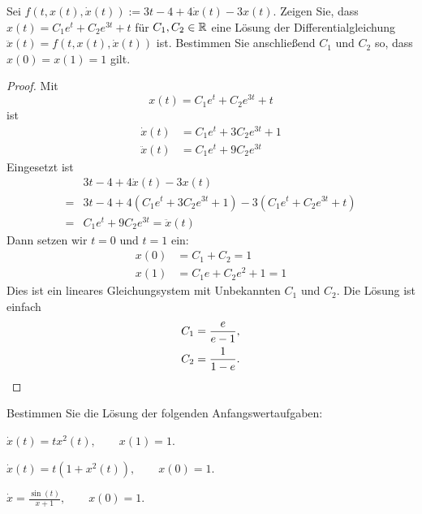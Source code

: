 \begin{Problem}
	Sei $f(t, x(t),\dot{x}(t)):=3t-4+4\dot{x}(t)-3x(t)$. Zeigen Sie, dass $x(t)=C_1 e^t + C_2 e^{3t}+t$ f\"{u}r $C_1, C_2\in \mathbb{R}$ eine Lösung der Differentialgleichung $\ddot{x}(t)=f(t, x(t), \dot{x}(t))$ ist. Bestimmen Sie anschließend $C_1$ und $C_2$ so, dass $x(0)=x(1)=1$ gilt.
\end{Problem}
\begin{proof}
Mit
\[
x(t)=C_1 e^t + C_2 e^{3t}+t
\]
ist
\begin{align*}
	\dot{x}(t)&= C_1 e^t + 3 C_2 e^{3t}+1\\
	\ddot{x}(t)&=C_1 e^t + 9 C_2 e^{3t}
\end{align*}
Eingesetzt ist
\begin{align*}
	&3t-4+4\dot{x}(t)-3x(t)\\
	=&3t-4+4(C_1 e^t + 3 C_2 e^{3t}+1)-3(C_1 e^t + C_2 e^{3t}+t)\\
	=&C_1e^t+9C_2e^{3t}=\ddot{x}(t)
\end{align*}
Dann setzen wir $t=0$ und $t=1$ ein:
\begin{align*}
	x(0)&=C_1+C_2=1\\
	x(1)&= C_1e + C_2 e^2+1=1
\end{align*}
Dies ist ein lineares Gleichungsystem mit Unbekannten $C_1$ und $C_2$. Die Lösung ist einfach
\begin{align*}
	C_1&=\frac{e}{e-1},\\
	C_2&=\frac{1}{1-e}.\qedhere
\end{align*}
\end{proof}
\begin{Problem}\label{pr:diffeqblatt1-2}
	Bestimmen Sie die Lösung der folgenden Anfangswertaufgaben:
	\begin{parts}
	\item $\dot{x}(t)=tx^2(t),\qquad x(1)=1$.
	\item $\dot{x}(t)=t(1+x^2(t)),\qquad x(0)=1$.
	\item $\dot{x}=\frac{\sin(t)}{x+1},\qquad x(0)=1$.
	\end{parts}
\end{Problem}
